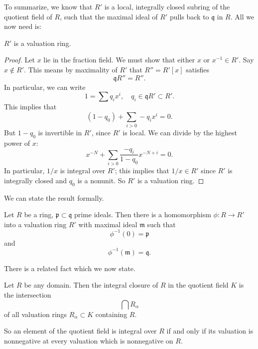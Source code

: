 To summarize, we know that $R'$ is a  local, integrally closed subring of the
quotient field of $R$, such that the maximal ideal of $R'$ pulls back to
$\mathfrak{q}$ in $R$.
All we now need is:

\begin{lemma} 
$R'$ is a valuation ring.
\end{lemma} 
\begin{proof} 
Let $x$ lie in the fraction field. We must show that either $x$ or $x^{-1} \in
R'$.  Say $x \notin R'$.  This means by maximality of $R'$ that $R'' = R'[x]$ satisfies
\[ \mathfrak{q}R'' = R''.  \]
In particular, we can write
\[ 1 = \sum q_i x^i, \quad q_i \in \mathfrak{q}R' \subset R'.  \]
This implies that
\[ (1-q_0) + \sum_{i > 0} -q_i x^i  = 0.  \]
But $1-q_0$ is invertible in $R'$, since $R'$ is local.  We can divide by the
highest power of $x$:
\[  x^{-N} + \sum_{i>0} \frac{-q_i}{1-q_0} x^{-N+i} = 0. \]
In particular, $1/x$ is integral over $R'$; this implies that $1/x \in R'$ since
$R'$ is integrally closed and $q_0$ is a nonunit. So
$R'$ is a valuation ring. 
\end{proof} 

We can state the result formally.
\begin{theorem} 
Let $R$ be a ring, $\mathfrak{p} \subset \mathfrak{q}$ prime ideals. Then there
is a homomorphism $\phi: R \to R'$ into a valuation ring $R'$ with maximal ideal
$\mathfrak{m}$ such that
\[ \phi^{-1}(0) = \mathfrak{p}  \]
and
\[ \phi^{-1}(\mathfrak{m} ) = \mathfrak{q} .\]
\end{theorem} 

There is a related fact which we now state.
\begin{theorem} 
Let $R$ be any domain. Then the integral closure of $R$ in the quotient field
$K$ is the intersection 
\[ \bigcap R_{\alpha}  \]
of all valuation rings $R_{\alpha} \subset K$ containing $R$.
\end{theorem} 
So an element of the quotient field is integral over $R$ if and only if its
valuation is nonnegative at every valuation which is nonnegative on $R$.


